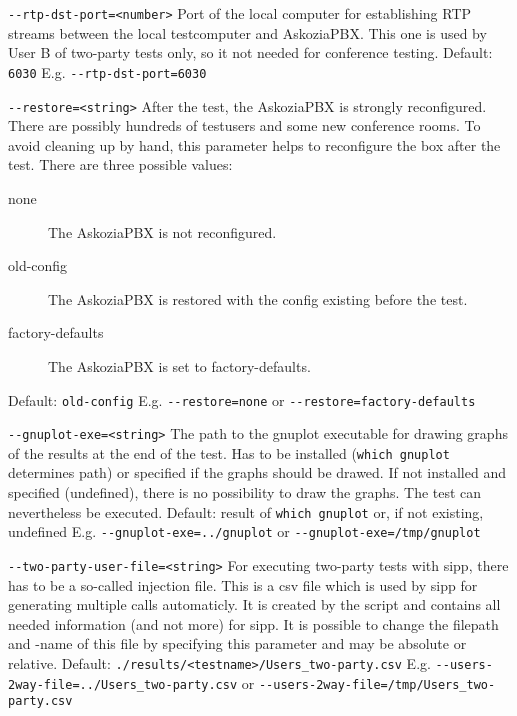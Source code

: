 \begin {description}
\item {\texttt{-{}-rtp-dst-port=<number>}} \newline
Port of the local computer for establishing RTP streams between the local testcomputer
and AskoziaPBX. This one is used by User B of two-party tests only, so it not needed
for conference testing.
\newline Default: \texttt{6030}
\newline E.g. \texttt{-{}-rtp-dst-port=6030}

\item {\texttt{-{}-restore=<string>}} \newline
After the test, the AskoziaPBX is strongly reconfigured. There are possibly hundreds
of testusers and some new conference rooms. To avoid cleaning up by hand, this parameter
helps to reconfigure the box after the test. There are three possible values:
\begin{description}
	\item [none] The AskoziaPBX is not reconfigured.
	\item [old-config] The AskoziaPBX is restored with the config existing before the test.
	\item [factory-defaults] The AskoziaPBX is set to factory-defaults.
\end{description}
Default: \texttt{old-config}
\newline E.g. \texttt{-{}-restore=none} or \texttt{-{}-restore=factory-defaults}

\item {\texttt{-{}-gnuplot-exe=<string>}} \newline
The path to the gnuplot executable for drawing graphs of the results at the end of the test.
Has to be installed (\texttt{which gnuplot} determines path) or specified if the graphs
should be drawed. If not installed and specified (undefined), there is no possibility to
draw the graphs. The test can nevertheless be executed.
\newline Default: result of \texttt{which gnuplot} or, if not existing, undefined
\newline E.g. \texttt{-{}-gnuplot-exe=../gnuplot} or \texttt{-{}-gnuplot-exe=/tmp/gnuplot}

\item {\texttt{-{}-two-party-user-file=<string>}} \newline
For executing two-party tests with sipp, there has to be a so-called injection file.
This is a csv file which is used by sipp for generating multiple calls automaticly.
It is created by the script and contains all needed information (and not more)
for sipp. It is possible to change the filepath and -name of this file by specifying
this parameter and may be absolute or relative.
\newline Default: \texttt{./results/<testname>/Users\_two-party.csv}
\newline E.g. \texttt{-{}-users-2way-file=../Users\_two-party.csv}
\newline or \texttt{-{}-users-2way-file=/tmp/Users\_two-party.csv}


\end{description}
